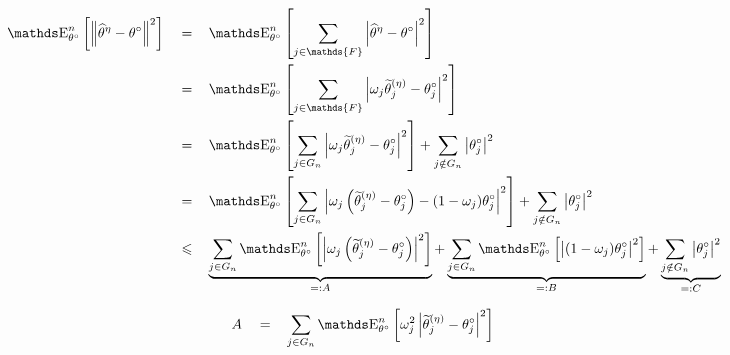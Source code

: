 \begin{alignat*}{3}
& \E_{\theta^{\circ}}^{n}\left[\left\Vert \widehat{\theta}^{\eta} - \theta^{\circ} \right\Vert^{2}\right] && = && \E_{\theta^{\circ}}^{n}\left[\sum\limits_{j \in \mathds{F}} \left\vert \widehat{\theta}^{\eta} - \theta^{\circ} \right\vert^{2}\right]\\
& && = && \E_{\theta^{\circ}}^{n}\left[\sum\limits_{j \in \mathds{F}} \left\vert \omega_{j} \widetilde{\theta}^{(\eta)}_{j} - \theta_{j}^{\circ} \right\vert^{2}\right]\\
& && = && \E_{\theta^{\circ}}^{n}\left[\sum\limits_{j \in G_{n}} \left\vert \omega_{j} \widetilde{\theta}^{(\eta)}_{j} - \theta_{j}^{\circ} \right\vert^{2} \right] + \sum\limits_{j \notin G_{n}} \left\vert \theta^{\circ}_{j} \right\vert^{2}\\
& && = && \E_{\theta^{\circ}}^{n}\left[\sum\limits_{j \in G_{n}} \left\vert \omega_{j}\left(\widetilde{\theta}^{(\eta)}_{j} - \theta_{j}^{\circ}\right) - (1 - \omega_{j}) \theta_{j}^{\circ}\right\vert^{2} \right] + \sum\limits_{j \notin G_{n}} \left\vert \theta^{\circ}_{j} \right\vert^{2}\\
& && \leq && \underbrace{\sum\limits_{j \in G_{n}} \E_{\theta^{\circ}}^{n}\left[\left\vert \omega_{j}\left(\widetilde{\theta}^{(\eta)}_{j} - \theta_{j}^{\circ}\right)\right\vert^{2}\right]}_{=: A} + \underbrace{\sum\limits_{j \in G_{n}} \E_{\theta^{\circ}}^{n}\left[\left\vert(1 - \omega_{j}) \theta_{j}^{\circ}\right\vert^{2} \right]}_{ =: B} + \underbrace{\sum\limits_{j \notin G_{n}} \left\vert \theta^{\circ}_{j} \right\vert^{2}}_{=: C}
\end{alignat*}


\begin{alignat*}{3}
& A && = && \sum\limits_{j \in G_{n}} \E_{\theta^{\circ}}^{n}\left[\omega_{j}^{2} \left\vert \widetilde{\theta}^{(\eta)}_{j} - \theta_{j}^{\circ}\right\vert^{2}\right]\\
\end{alignat*}
















